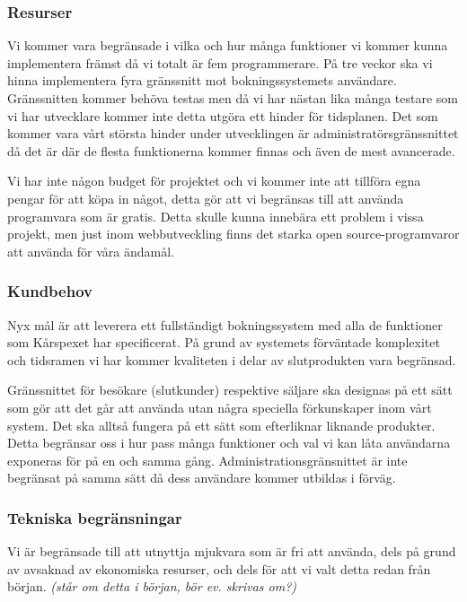 \documentclass[a4paper, twoside, 11pt, titlepage]{article}
\begin{document}
	\subsubsection{Resurser}


		Vi kommer vara begränsade i vilka och hur många funktioner vi kommer kunna implementera främst då vi totalt är fem programmerare. På tre veckor ska vi hinna implementera fyra gränssnitt mot bokningssystemets användare. Gränssnitten kommer behöva testas men då vi har nästan lika många testare som vi har utvecklare kommer inte detta utgöra ett hinder för tidsplanen. Det som kommer vara vårt största hinder under utvecklingen är administratörsgränssnittet då det är där de flesta funktionerna kommer finnas och även de mest avancerade.

		Vi har inte någon budget för projektet och vi kommer inte att tillföra egna pengar för att köpa in något, detta gör att vi begränsas till att använda programvara som är gratis. Detta skulle kunna innebära ett problem i vissa projekt, men just inom webbutveckling finns det starka open source-programvaror att använda för våra ändamål.

	\subsubsection{Kundbehov}


		Nyx mål är att leverera ett fullständigt bokningssystem med alla de funktioner som Kårspexet har specificerat. På grund av systemets förväntade komplexitet och tidsramen vi har kommer kvaliteten i delar av slutprodukten vara begränsad.

		Gränssnittet för besökare (slutkunder) respektive säljare ska designas på ett sätt som gör att det går att använda utan några speciella förkunskaper inom vårt system. Det ska alltså fungera på ett sätt som efterliknar liknande produkter. Detta begränsar oss i hur pass många funktioner och val vi kan låta användarna exponeras för på en och samma gång. Administrationsgränsnittet är inte begränsat på samma sätt då dess användare kommer utbildas i förväg.

	\subsubsection{Tekniska begränsningar}


		Vi är begränsade till att utnyttja mjukvara som är fri att använda, dels på grund av avsaknad av ekonomiska resurser, och dels för att vi valt detta redan från början. \emph{(står om detta i början, bör ev. skrivas om?)}
\end{document}

